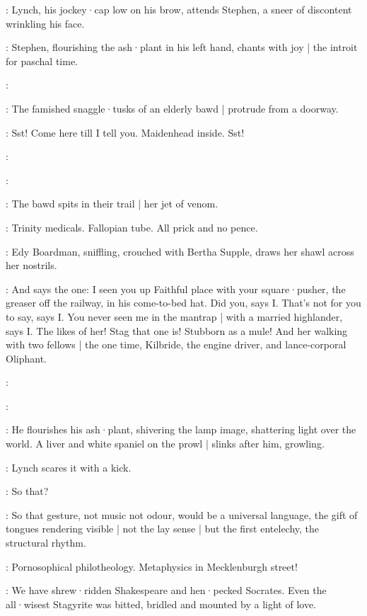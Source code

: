 :
Lynch,
his jockey·cap low on his brow,
attends Stephen,
a sneer of discontent wrinkling his face.

:
Stephen,
flourishing the ash·plant in his left hand,
chants with joy |
the introit for paschal time.

\Stephen:

:
The famished snaggle·tusks of an elderly bawd |
protrude from a doorway.

\Bawd:
Sst!
Come here till I tell you.
Maidenhead inside.
Sst!

:

\Stephen:

:
The bawd spits in their trail |
her jet of venom.

\Bawd:
Trinity medicals.
Fallopian tube.
All prick and no pence.

:
Edy Boardman,
sniffling,
crouched with Bertha Supple,
draws her shawl across her nostrils.

\Edy:
And says the one:
I seen you up Faithful place with your square·pusher,
the greaser off the railway,
in his come-to-bed hat.
Did you,
says I.
That's not for you to say,
says I.
You never seen me in the mantrap |
with a married highlander,
says I.
The likes of her!
Stag that one is!
Stubborn as a mule!
And her walking with two fellows |
the one time,
Kilbride,
the engine driver,
and lance-corporal Oliphant.

:

\Stephen:

:
He flourishes his ash·plant,
shivering the lamp image,
shattering light over the world.
A liver and white spaniel on the prowl |
slinks after him,
growling.

:
Lynch scares it with a kick.

\Lynch:
So that?

\Stephen:
\sout{}
So that gesture,
not music not odour,
would be a universal language,
the gift of tongues rendering visible |
not the lay sense |
but the first entelechy,
the structural rhythm.

\Lynch:
Pornosophical philotheology.
Metaphysics in Mecklenburgh street!

\Stephen:
We have shrew·ridden Shakespeare and hen·pecked Socrates.
Even the all·wisest Stagyrite was bitted,
bridled and mounted by a light of love.

